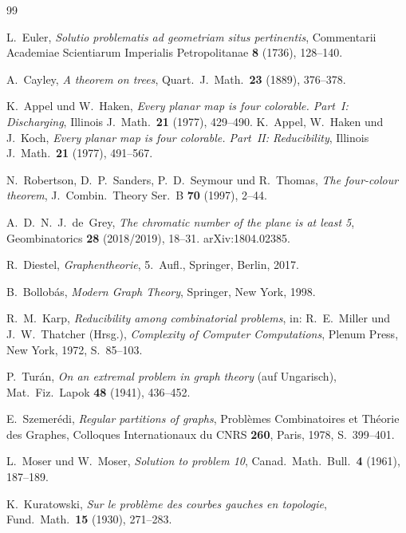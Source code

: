 \documentclass[12pt,a4paper]{amsart}
\theoremstyle{definition}
\theoremstyle{remark}
\begin{document}
\begin{thebibliography}{99}

L.~Euler,
\emph{Solutio problematis ad geometriam situs pertinentis},
Commentarii Academiae Scientiarum Imperialis Petropolitanae \textbf{8} (1736),
128--140.

A.~Cayley,
\emph{A theorem on trees},
Quart.\ J.\ Math.\ \textbf{23} (1889), 376--378.

K.~Appel und W.~Haken,
\emph{Every planar map is four colorable. Part~I: Discharging},
Illinois J.\ Math.\ \textbf{21} (1977), 429--490.
K.~Appel, W.~Haken und J.~Koch,
\emph{Every planar map is four colorable. Part~II: Reducibility},
Illinois J.\ Math.\ \textbf{21} (1977), 491--567.

N.~Robertson, D.~P.~Sanders, P.~D.~Seymour und R.~Thomas,
\emph{The four-colour theorem},
J.\ Combin.\ Theory Ser.\ B \textbf{70} (1997), 2--44.

A.~D.~N.~J.\ de~Grey,
\emph{The chromatic number of the plane is at least 5},
Geombinatorics \textbf{28} (2018/2019), 18--31.
arXiv:1804.02385.

R.~Diestel,
\emph{Graphentheorie},
5.~Aufl., Springer, Berlin, 2017.

B.~Bollob\'{a}s,
\emph{Modern Graph Theory},
Springer, New York, 1998.

R.~M.~Karp,
\emph{Reducibility among combinatorial problems},
in: R.~E.~Miller und J.~W.~Thatcher (Hrsg.),
\emph{Complexity of Computer Computations},
Plenum Press, New York, 1972, S.~85--103.

P.~Tur\'{a}n,
\emph{On an extremal problem in graph theory} (auf Ungarisch),
Mat.\ Fiz.\ Lapok \textbf{48} (1941), 436--452.

E.~Szemer\'{e}di,
\emph{Regular partitions of graphs},
Probl\`{e}mes Combinatoires et Th\'{e}orie des Graphes,
Colloques Internationaux du CNRS \textbf{260}, Paris, 1978, S.~399--401.

L.~Moser und W.~Moser,
\emph{Solution to problem 10},
Canad.\ Math.\ Bull.\ \textbf{4} (1961), 187--189.

K.~Kuratowski,
\emph{Sur le probl\`{e}me des courbes gauches en topologie},
Fund.\ Math.\ \textbf{15} (1930), 271--283.

\end{thebibliography}
\end{document}
